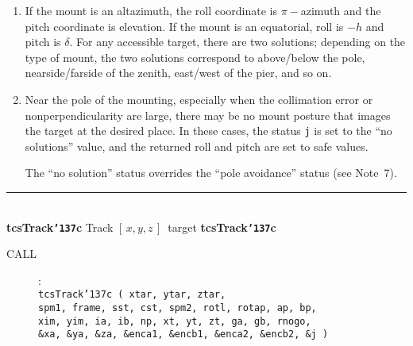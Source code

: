 \documentclass[12pt,fleqn,twoside]{article}
\renewcommand{\_}{{\tt\char'137}}     %
\newcommand{\xyz}       {$[\,x,y,z\,]$}
\newcommand{\routine}[2]
{
  \newpage
  \rule{\textwidth}{0.3mm}\\ \nopagebreak
  {\Large {\bf #1} \hfill #2 \hfill {\bf #1}}
  \vspace{-1ex}
}
\newcommand{\call}[1]
{
  \goodbreak
  \begin{description}
    \item[CALL]: \\[0.5ex] \nopagebreak
        {\tt #1}
  \end{description}
  \vspace{-3ex}
}
\begin{document}
{\begin{enumerate}
      The argument {\tt rnogo} specifies how close to the pole of the
      mounting the target is allowed to be.  If the target is too
      close, the routine aims instead for a fictitious target further
      out, on the edge of the forbidden region.  A warning status is
      set when this ``pole avoidance'' action is taken.

      It is permissible to set {\tt rnogo} to zero, and to handle any pole
      problems in the TCS application itself.  Two strategies that
      might be considered as an alternative to the {\tt rnogo} approach are
      (i)~progressive scaling back of certain of the pointing
      coefficients so that close to the pole the mount becomes
      nominally perfect, and (ii)~substituting a fictitious target that
      makes the telescope loiter on the edge of the awkward region
      until the real target catches up.
\item If the mount is an altazimuth, the roll coordinate is $\pi-$azimuth
      and the pitch coordinate is elevation.  If the mount is an
      equatorial, roll is $-h$ and pitch is $\delta$.  For any
      accessible target, there are two solutions; depending on the type
      of mount, the two solutions correspond to above/below the pole,
      nearside/farside of the zenith, east/west of the pier, and so on.
\item Near the pole of the mounting, especially when the collimation
      error or nonperpendicularity are large, there may be no mount
      posture that images the target at the desired place.  In these
      cases, the status {\tt j}
      is set to the ``no solutions'' value, and the
      returned roll and pitch are set to safe values.

      The ``no solution'' status overrides the ``pole avoidance'' status
      (see Note~7).
\end{enumerate}
}
\routine{tcsTrack\_c}{Track \xyz\ target}
\label{tcsTrack_c}
\call{tcsTrack\_c ( xtar, ytar, ztar, \\
      \hspace*{6em} spm1, frame, sst, cst, spm2, rotl, rotap, ap, bp, \\
      \hspace*{6em} xim, yim, ia, ib, np,
                    xt, yt, zt, ga, gb, rnogo, \\
      \hspace*{6em} \&xa, \&ya, \&za, \&enca1, \&encb1,
                    \&enca2, \&encb2, \&j ) }
\end{document}
